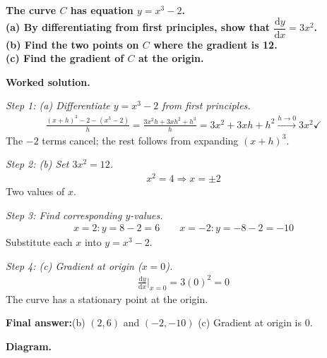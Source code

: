 \documentclass[11pt]{article}
\newcommand{\question}[1]{\par\medskip\noindent\textbf{#1}\par}
\begin{document}
\question{The curve \( C \) has equation \( y = x^3 - 2 \).\\[3pt]  (a) By differentiating from first principles, show that \( \dfrac{\mathrm{d}y}{\mathrm{d}x} = 3x^2 \).\\[3pt]  (b) Find the two points on \( C \) where the gradient is 12.\\[3pt]  (c) Find the gradient of \( C \) at the origin.}

\textbf{Worked solution.}

\textit{Step 1: (a) Differentiate \( y = x^3 - 2 \) from first principles.}
\[\begin{gathered}
\frac{(x+h)^3 - 2 - (x^3 - 2)}{h} = \frac{3x^2h + 3xh^2 + h^3}{h} = 3x^2 + 3xh + h^2 \xrightarrow{h\to 0} 3x^2 \checkmark
\end{gathered}\]
The \( -2 \) terms cancel; the rest follows from expanding \( (x+h)^3 \).

\textit{Step 2: (b) Set \( 3x^2 = 12 \).}
\[\begin{gathered}
x^2 = 4 \Rightarrow x = \pm 2
\end{gathered}\]
Two values of \( x \).

\textit{Step 3: Find corresponding \( y \)-values.}
\[\begin{gathered}
x = 2: y = 8 - 2 = 6 \qquad x = -2: y = -8 - 2 = -10
\end{gathered}\]
Substitute each \( x \) into \( y = x^3 - 2 \).

\textit{Step 4: (c) Gradient at origin (\( x = 0 \)).}
\[\begin{gathered}
\frac{\mathrm{d}y}{\mathrm{d}x}\bigg|_{x=0} = 3(0)^2 = 0
\end{gathered}\]
The curve has a stationary point at the origin.

\begin{answerbox}
\textbf{Final answer:}\quad (b) \(\displaystyle  (2, 6) \) and \(\displaystyle  (-2, -10) \) \quad  (c) Gradient at origin is 0.
\end{answerbox}
\textbf{Diagram.}
\end{document}
